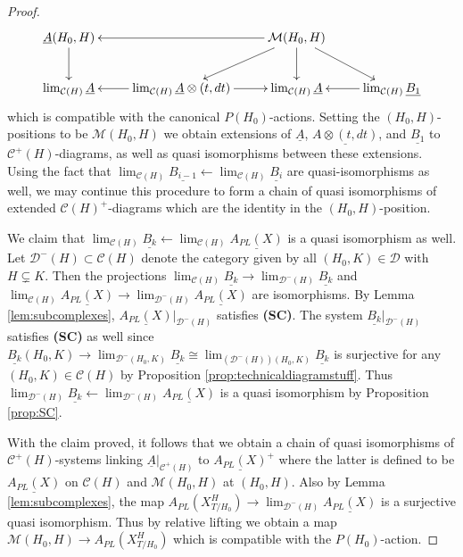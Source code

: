 \documentclass[12pt,a4paper]{article}
\theoremstyle{definition}
\begin{document}
\begin{proof}
\[\xymatrix{
\underline{A}(H_0,H)\ar[d] & & \mathcal{M}(H_0,H)\ar[ll]\ar[d]\ar[dr]\ar[dl] & \\
\lim_{\mathcal{C}(H)}\underline{A}& \lim_{\mathcal{C}(H)}\underline{A}\otimes (t,dt)\ar[l] \ar[r]& \lim_{\mathcal{C}(H)}\underline{A} &\lim_{\mathcal{C}(H)}\underline{B_1}\ar[l]
}\]
which is compatible with the canonical $P(H_0)$-actions. Setting the $(H_0,H)$-positions to be $\mathcal{M}(H_0,H)$ we obtain extensions of $\underline{A}$, $\underline{A\otimes (t,dt)}$, and $\underline{B_1}$ to $\mathcal{C}^+(H)$-diagrams, as well as quasi isomorphisms between these extensions. Using the fact that $\lim_{\mathcal{C}(H)}\underline{B_{i-1}}\leftarrow\lim_{\mathcal{C}(H)}\underline{B_{i}}$ are quasi-isomorphisms as well, we may continue this procedure to form a chain of quasi isomorphisms of extended $\mathcal{C}(H)^+$-diagrams which are the identity in the $(H_0,H)$-position.

We claim that $\lim_{\mathcal{C}(H)}\underline{B_k}\leftarrow \lim_{\mathcal{C}(H)}\underline{A_{PL}(X)}$
is a quasi isomorphism as well. Let $\mathcal{D}^-(H)\subset \mathcal{C}(H)$ denote the category given by all $(H_0,K)\in\mathcal{D}$ with $H\subsetneq K$. Then the projections $\lim_{\mathcal{C}(H)}\underline{B_k}\rightarrow \lim_{\mathcal{D}^-(H)}\underline{B_k}$ and $\lim_{\mathcal{C}(H)}\underline{A_{PL}(X)}\rightarrow \lim_{\mathcal{D}^-(H)}\underline{A_{PL}(X)}$ are isomorphisms. By Lemma \ref{lem:subcomplexes}, $\underline{A_{PL}(X)}|_{\mathcal{D}^-(H)}$ satisfies \textbf{(SC)}. The system $\underline{B_k}|_{\mathcal{D}^-(H)}$ satisfies \textbf{(SC)} as well since $\underline{B_k}(H_0,K)\rightarrow \lim_{\mathcal{D}^-(H_0,K)} \underline{B_k}\cong \lim_{(\mathcal{D}^-(H))(H_0,K)} \underline{B_k}$ is surjective for any $(H_0,K)\in \mathcal{C}(H)$ by Proposition \ref{prop:technicaldiagramstuff}.
Thus $\lim_{\mathcal{D}^-(H)}\underline{B_k}\leftarrow \lim_{\mathcal{D}^-(H)}\underline{A_{PL}(X)}$ is a quasi isomorphism by Proposition \ref{prop:SC}.

With the claim proved, it follows that we obtain a chain of quasi isomorphisms of $\mathcal{C}^+(H)$-systems linking $\underline{A}|_{\mathcal{C}^+(H)}$ to $\underline{A_{PL}(X)}^+$ where the latter is defined to be $\underline{A_{PL}(X)}$ on $\mathcal{C}(H)$ and $\mathcal{M}(H_0,H)$ at $(H_0,H)$. Also by Lemma \ref{lem:subcomplexes}, the map $A_{PL}(X_{T/H_0}^H)\rightarrow \lim_{\mathcal{D}^-(H)}\underline{A_{PL}(X)}$ is a surjective quasi isomorphism. Thus by relative lifting we obtain a map $\mathcal{M}(H_0,H)\rightarrow A_{PL}(X_{T/H_0}^H)$ which is compatible with the $P(H_0)$-action.


\end{proof}
\end{document}
